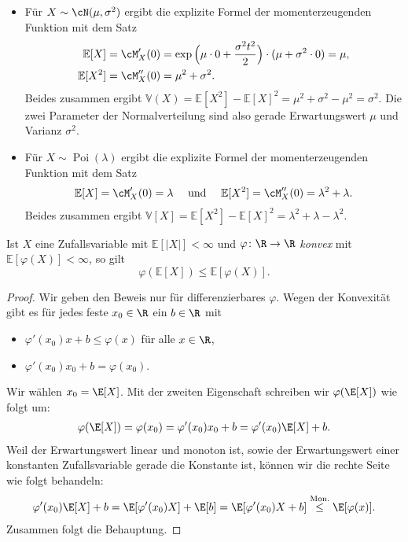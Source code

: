 \begin{beispiel}\abs
	\begin{itemize}
		\item F\"ur $X \sim \cN(\mu, \sigma^2)$ ergibt die explizite Formel der momenterzeugenden Funktion mit dem Satz
		\begin{align*}
		\mathbb{E}[X] &= \cM_X'(0) = \exp\Big(\mu\cdot0 + \frac{\sigma^2 t^2}{2}\Big)\cdot (\mu + \sigma^2 \cdot 0) = \mu, \\
		\mathbb{E}[X^2] &= \cM_X''(0) = \mu^2 + \sigma^2.
		\end{align*}
		Beides zusammen ergibt $\mathbb{V}(X) = \mathbb{E}[X^2] - \mathbb{E}[X]^2 = \mu^2 + \sigma^2 - \mu^2 = \sigma^2$. Die zwei Parameter der Normalverteilung sind also gerade Erwartungswert $\mu$ und Varianz $\sigma^2$.
		\item F\"ur $X \sim \operatorname{Poi}(\lambda)$ ergibt die explizite Formel der momenterzeugenden Funktion mit dem Satz
		\begin{align*}
		\mathbb{E}[X] = \cM_X'(0) = \lambda \quad \text{ und }\quad  \mathbb{E}[X^2] = \cM_X''(0) = \lambda^2 + \lambda.
		\end{align*}
		Beides zusammen ergibt $\mathbb{V}[X] = \mathbb{E}[X^2] - \mathbb{E}[X]^2 = \lambda^2 + \lambda - \lambda^2$.
	\end{itemize}
\end{beispiel}


\begin{prop}\label{jensen}
	Ist $X$ eine Zufallsvariable mit $\mathbb{E}[|X|] < \infty$ und $\varphi \colon \R \to \R $ \textit{konvex} mit $\mathbb{E}[\varphi(X)] < \infty$, so gilt
	\[ \varphi(\mathbb{E}[X]) \leq \mathbb{E}[\varphi(X)]. \]
\end{prop}


\begin{proof}
	Wir geben den Beweis nur f\"ur differenzierbares $\varphi$. Wegen der Konvexität gibt es f\"ur jedes feste $x_0 \in \R$ ein $b\in\R$ mit
	\begin{itemize}
		\item $ \varphi'(x_0) x + b \leq \varphi(x)$ f\"ur alle $x\in\R$,
		\item $ \varphi'(x_0) x_0 + b = \varphi(x_0)$.
	\end{itemize}
	Wir w\"ahlen $x_0 = \E[X]$. Mit der zweiten Eigenschaft schreiben wir $\varphi(\E[X])$ wie folgt um:
	\begin{align*}
	\varphi(\E[X]) = \varphi(x_0) = \varphi'(x_0) x_0 + b = \varphi'(x_0) \E[X] + b.
	\end{align*}
	Weil der Erwartungswert linear und monoton ist, sowie der Erwartungswert einer konstanten Zufallsvariable gerade die Konstante ist, k\"onnen wir die rechte Seite wie folgt behandeln:
	\begin{align*}	
	\varphi'(x_0) \E[X] + b= \E[\varphi'(x_0) X] + \E[b] = \E[\varphi'(x_0) X + b] \overset{\text{Mon.}}{\leq} \E[\varphi(x)].
	\end{align*}
	Zusammen folgt die Behauptung.
\end{proof}


